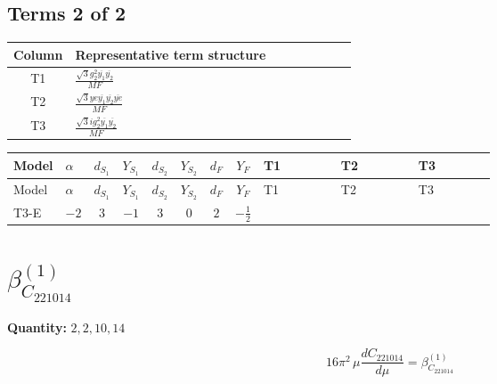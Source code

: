 \documentclass[8pt]{article}
\begin{document}
\begin{landscape}
\subsection*{Terms 2 of 2}
\begin{center}
\begin{tabular}{@{}c >{\raggedright\arraybackslash}p{0.82\linewidth}@{}}
\toprule
Column & Representative term structure \\
\midrule
T1 & \(\displaystyle \frac{\sqrt{3} g_{2}^{2} \overline{y_{1}} \overline{y_{2}}}{MF}\) \\
\midrule
T2 & \(\displaystyle \frac{\sqrt{3} ye \overline{y_{1}} \overline{y_{2}} \overline{ye}}{MF}\) \\
\midrule
T3 & \(\displaystyle \frac{\sqrt{3} i g_{2}^{2} \overline{y_{1}} \overline{y_{2}}}{MF}\) \\
\midrule
\bottomrule
\end{tabular}
\end{center}
\smallskip
\tiny
\begin{longtable}{@{}llcccccc >{\raggedright\arraybackslash}p{0.21\linewidth} >{\raggedright\arraybackslash}p{0.21\linewidth} >{\raggedright\arraybackslash}p{0.21\linewidth}@{}}
\toprule
Model & $\alpha$ & $d_{S_1}$ & $Y_{S_1}$ & $d_{S_2}$ & $Y_{S_2}$ & $d_F$ & $Y_F$ & T1 & T2 & T3 \\
\midrule
\endfirsthead
\toprule
Model & $\alpha$ & $d_{S_1}$ & $Y_{S_1}$ & $d_{S_2}$ & $Y_{S_2}$ & $d_F$ & $Y_F$ & T1 & T2 & T3 \\
\midrule
\endhead
T3-E & $-2$ & $3$ & $-1$ & $3$ & $0$ & $2$ & $-\frac{1}{2}$ & \scriptsize\adjustbox{max width=\linewidth}{$\begin{gathered} \frac{11 \sqrt{3} g_{2}^{2} \overline{y_{1}} \overline{y_{2}}}{8 MF}\end{gathered}$} & \scriptsize\adjustbox{max width=\linewidth}{$\begin{gathered} - \frac{\sqrt{3} ye \overline{y_{1}} \overline{y_{2}} \overline{ye}}{12 MF}\end{gathered}$} & \scriptsize\adjustbox{max width=\linewidth}{$\begin{gathered} \frac{\sqrt{3} i g_{2}^{2} \overline{y_{1}} \overline{y_{2}}}{6 MF}\end{gathered}$} \\
\midrule
\bottomrule
\end{longtable}
\clearpage
\section*{$\beta_{C_{221014}}^{(1)}$}
\noindent\textbf{Quantity: }$\mathrm{2,2,10,14}$\par\smallskip
\[16\pi^2\,\mu\frac{d C_{221014}}{d\mu}=\beta_{C_{221014}}^{(1)}\]

\end{landscape}
\end{document}
